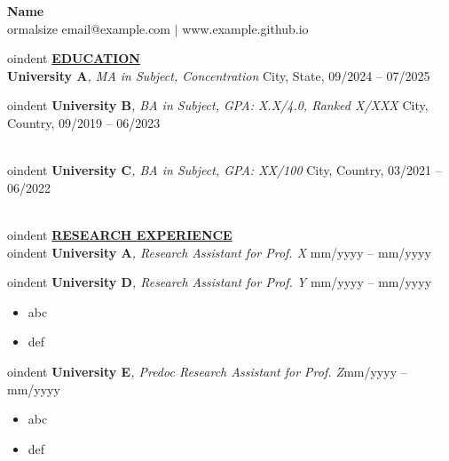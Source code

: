 \documentclass{article}
\begin{document}
\begin{center}
\thispagestyle{empty}
\large \textbf{Name} \\

ormalsize email@example.com $\mid$ www.example.github.io    
\end{center}


oindent \textbf{\underline{EDUCATION}} \\
\textbf{University A}\textit{, MA in Subject, Concentration} \hfill City, State, 09/2024 -- 07/2025 


oindent \textbf{University B}\textit{, BA in Subject, GPA: X.X/4.0, Ranked X/XXX} \hfill City, Country, 09/2019 -- 06/2023 \\
\textbullet{}  \\
\textbullet{}  


oindent \textbf{University C}\textit{, BA in Subject, GPA: XX/100} \hfill City, Country, 03/2021 -- 06/2022 \\
\textbullet{}  \\
\textbullet{}  


oindent \textbf{\underline{RESEARCH EXPERIENCE}} \\

oindent \textbf{University A}\textit{, Research Assistant for Prof. X} \hfill mm/yyyy -- mm/yyyy


oindent \textbf{University D}\textit{, Research Assistant for Prof. Y} \hfill mm/yyyy -- mm/yyyy
\begin{itemize}[noitemsep,nolistsep,leftmargin=*]
\item {abc}
\item {def}
\end{itemize}


oindent \textbf{University E}\textit{, Predoc Research Assistant for Prof. Z}\hfill mm/yyyy -- mm/yyyy
\begin{itemize}[noitemsep,nolistsep,leftmargin=*]
\item {abc}
\item {def}
\end{itemize}
\end{document}
